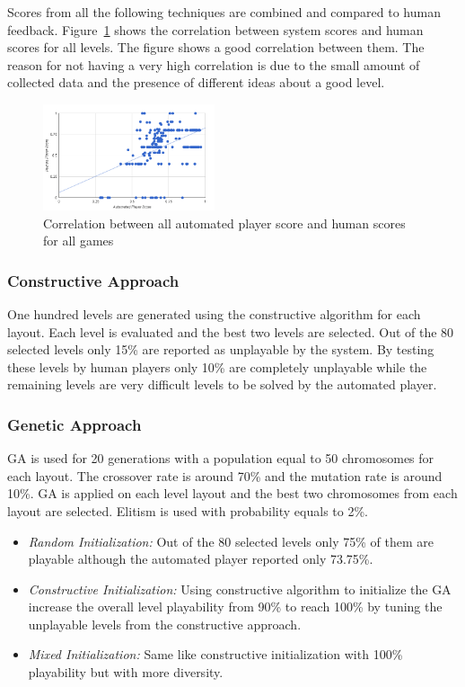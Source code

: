 \documentclass[letterpaper]{article}
\newcommand{\figref}[1]{Figure~\ref{Figure:#1}}
\begin{document}
Scores from all the following techniques are combined and compared to human feedback. \figref{totalCorrelation} shows the correlation between system scores and human scores for all levels. The figure shows a good correlation between them. The reason for not having a very high correlation is due to the small amount of collected data and the presence of different ideas about a good level.

\begin{figure}
  	\centering
    \includegraphics[width=0.45\textwidth]{Images/totalCorrelation}
    \caption{Correlation between all automated player score and human scores for all games}
    \label{Figure:totalCorrelation}
\end{figure}

\subsubsection{Constructive Approach}
One hundred levels are generated using the constructive algorithm for each layout. Each level is evaluated and the best two levels are selected. Out of the 80 selected levels only 15\% are reported as unplayable by the system. By testing these levels by human players only 10\% are completely unplayable while the remaining levels are very difficult levels to be solved by the automated player.

\subsubsection{Genetic Approach}
GA is used for 20 generations with a population equal to 50 chromosomes for each layout. The crossover rate is around 70\% and the mutation rate is around 10\%. GA is applied on each level layout and the best two chromosomes from each layout are selected. Elitism is used with probability equals to 2\%.
\begin{itemize}
	\item \emph{Random Initialization:} Out of the 80 selected levels only 75\% of them are playable although the automated player reported only 73.75\%.
	\item \emph{Constructive Initialization:} Using constructive algorithm to initialize the GA increase the overall level playability from 90\% to reach 100\% by tuning the unplayable levels from the constructive approach.
	\item \emph{Mixed Initialization:} Same like constructive initialization with 100\% playability but with more diversity.
\end{itemize}
\end{document}
